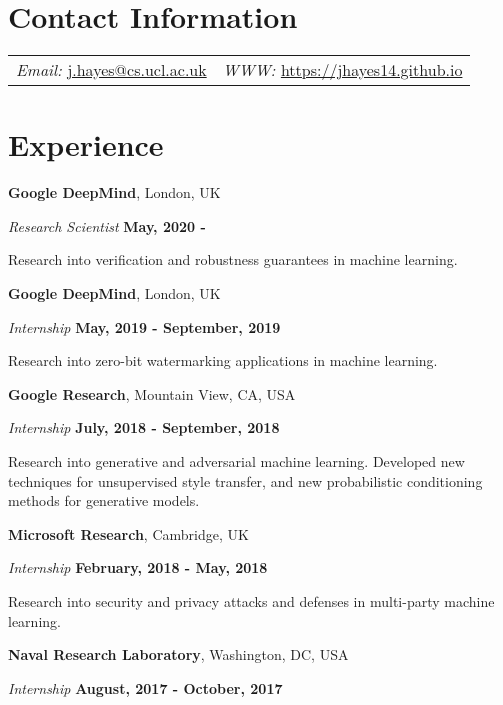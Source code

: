 \documentclass[margin,line]{res}
\begin{document}

\begin{resume}
\section{\sc Contact Information}
\vspace{.05in}
\begin{tabular}{@{}p{3in}p{4in}}
{\it Email:}    \url{j.hayes@cs.ucl.ac.uk} 
& {\it WWW:} \url{https://jhayes14.github.io}\\      
   
\end{tabular}

\section{\sc Experience}

{\bf Google DeepMind}, London, UK

\vspace{-.3cm}
{\em Research Scientist} \hfill {\bf May, 2020 - }

Research into verification and robustness guarantees in machine learning.

{\bf Google DeepMind}, London, UK

\vspace{-.3cm}
{\em Internship} \hfill {\bf May, 2019 - September, 2019}

Research into zero-bit watermarking applications in machine learning.

{\bf Google Research}, Mountain View, CA, USA

\vspace{-.3cm}
{\em Internship} \hfill {\bf July, 2018 - September, 2018}

Research into generative and adversarial machine learning. Developed new techniques for unsupervised style transfer,
and new probabilistic conditioning methods for generative models.

{\bf Microsoft Research}, Cambridge, UK

\vspace{-.3cm}
{\em Internship} \hfill {\bf February, 2018 - May, 2018}

Research into security and privacy attacks and defenses in multi-party machine learning.

{\bf Naval Research Laboratory}, Washington, DC, USA

\vspace{-.3cm}
{\em Internship} \hfill {\bf August, 2017 - October, 2017}


\end{resume}
\end{document}
